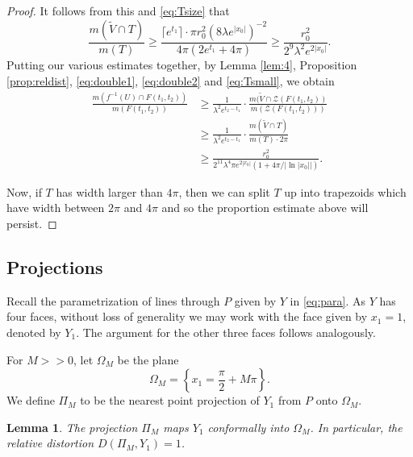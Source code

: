 \documentclass[11pt]{amsart}
\newtheorem{lemma}[theorem]{Lemma}
\numberwithin{equation}{section}
\theoremstyle{definition}
\theoremstyle{definition}
\theoremstyle{definition}
\begin{document}
\begin{proof}
It follows from this and \eqref{eq:Tsize} that 
\begin{equation}
    \label{eq:Tsmall}
\frac{ m(\widetilde{V}\cap T)}{m(T)} \geq \frac{\lceil e^{t_1} \rceil \cdot \pi r_0^2(8\lambda e^{|x_0|})^{-2} }{ 4\pi ( 2e^{t_1} + 4\pi) } \geq \frac{r_0^2}{2^9 \lambda^2 e^{2|x_0|} }.   
\end{equation}
Putting our various estimates together, by Lemma \ref{lem:4}, Proposition \ref{prop:reldist}, \eqref{eq:double1}, \eqref{eq:double2} and \eqref{eq:Tsmall}, we obtain
\begin{align*}
\frac{ m(f^{-1}(U) \cap F(t_1,t_2) ) }{m(F(t_1,t_2))} &\geq \frac{1}{\lambda^2 e^{t_2-t_1}} \cdot \frac{ m(\widetilde{V} \cap \mathcal{Z}(F(t_1,t_2)) }{m(\mathcal{Z}(F(t_1,t_2)))} \\
&\geq \frac{1}{\lambda^2 e^{t_2-t_1}} \cdot \frac {m(\widetilde{V} \cap T)}{ m(T) \cdot 2\pi} \\
&\geq \frac{ r_0^2}{ 2^{11}\lambda^4 \pi e^{2|x_0|}(1 + 4\pi / |\ln |x_0||) }.
\end{align*}

Now, if $T$ has width larger than $4\pi$, then we can split $T$ up into trapezoids which have width between $2\pi$ and $4\pi$ and so the proportion estimate above will persist.
\end{proof}


\subsection{Projections}
\label{ss:proj}

Recall the parametrization of lines through $P$ given by $Y$ in \eqref{eq:para}. As $Y$ has four faces, without loss of generality we may work with the face given by $x_1=1$, denoted by $Y_1$. The argument for the other three faces follows analogously.

For $M>>0$, let $\Omega_M$ be the plane
\[ \Omega_M = \left \{ x_1 = \frac{\pi}{2} + M \pi \right \}.\]
We define $\Pi_M$ to be the nearest point projection of $Y_1$ from $P$ onto $\Omega_M$.

\begin{lemma}
    \label{lem:M}
The projection $\Pi_M$ maps $Y_1$ conformally into $\Omega_M$. In particular, the relative distortion $D(\Pi_M , Y_1) = 1$.
\end{lemma}
\end{document}
